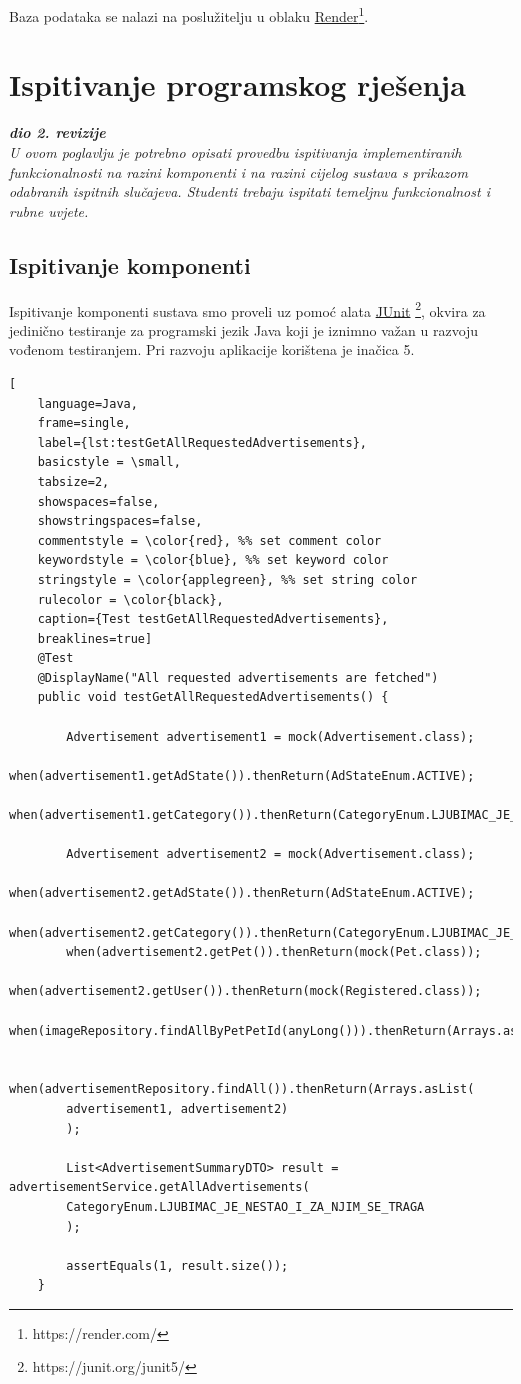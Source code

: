 Baza podataka se nalazi na poslužitelju u oblaku \underline{Render}\footnote{https://render.com/}.

\eject


\section{Ispitivanje programskog rješenja}

\textbf{\textit{dio 2. revizije}}\\

\textit{U ovom poglavlju je potrebno opisati provedbu ispitivanja implementiranih funkcionalnosti na razini komponenti i na razini cijelog sustava s prikazom odabranih ispitnih slučajeva. Studenti trebaju ispitati temeljnu funkcionalnost i rubne uvjete.}

\subsection{Ispitivanje komponenti}
Ispitivanje komponenti sustava smo proveli uz pomoć alata \underline{JUnit} \footnote{https://junit.org/junit5/}, okvira za jedinično testiranje za programski jezik Java koji je iznimno važan u razvoju vođenom testiranjem. Pri razvoju aplikacije korištena je inačica 5.

\renewcommand{\lstlistingname}{Kod}
\begin{lstlisting}[
	language=Java,
	frame=single,
	label={lst:testGetAllRequestedAdvertisements},
	basicstyle = \small,
	tabsize=2,
	showspaces=false,
	showstringspaces=false,
	commentstyle = \color{red}, %% set comment color
	keywordstyle = \color{blue}, %% set keyword color
	stringstyle = \color{applegreen}, %% set string color
	rulecolor = \color{black},
	caption={Test testGetAllRequestedAdvertisements},
	breaklines=true]
	@Test
	@DisplayName("All requested advertisements are fetched")
	public void testGetAllRequestedAdvertisements() {
		
		Advertisement advertisement1 = mock(Advertisement.class);
		when(advertisement1.getAdState()).thenReturn(AdStateEnum.ACTIVE);
		when(advertisement1.getCategory()).thenReturn(CategoryEnum.LJUBIMAC_JE_SRETNO_PRONADEN);
		
		Advertisement advertisement2 = mock(Advertisement.class);
		when(advertisement2.getAdState()).thenReturn(AdStateEnum.ACTIVE);
		when(advertisement2.getCategory()).thenReturn(CategoryEnum.LJUBIMAC_JE_NESTAO_I_ZA_NJIM_SE_TRAGA);
		when(advertisement2.getPet()).thenReturn(mock(Pet.class));
		when(advertisement2.getUser()).thenReturn(mock(Registered.class));
		when(imageRepository.findAllByPetPetId(anyLong())).thenReturn(Arrays.asList(mock(Image.class)));
		
		when(advertisementRepository.findAll()).thenReturn(Arrays.asList(
		advertisement1, advertisement2)
		);
		
		List<AdvertisementSummaryDTO> result = advertisementService.getAllAdvertisements(
		CategoryEnum.LJUBIMAC_JE_NESTAO_I_ZA_NJIM_SE_TRAGA
		);
		
		assertEquals(1, result.size());
	}
\end{lstlisting}

